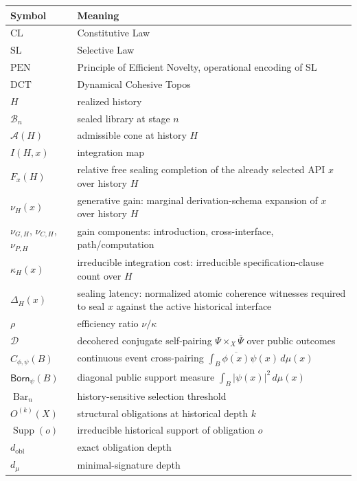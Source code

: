 \documentclass[11pt]{article}
\theoremstyle{plain}
\theoremstyle{definition}
\theoremstyle{remark}
\newcommand{\CL}{\mathrm{CL}}
\newcommand{\SLaw}{\mathrm{SL}}
\newcommand{\PEN}{\mathrm{PEN}}
\newcommand{\DCT}{\mathrm{DCT}}
\newcommand{\B}{\mathcal{B}}
\newcommand{\A}{\mathcal{A}}
\newcommand{\Supp}{\operatorname{Supp}}
\newcommand{\SelBar}{\operatorname{Bar}}
\begin{document}
\begin{longtable}{@{}>{\raggedright\arraybackslash}p{}>{\raggedright\arraybackslash}p{}@{}}
\toprule
Symbol & Meaning \\
\midrule
\endhead
\(\CL\) & Constitutive Law \\
\(\SLaw\) & Selective Law \\
\(\PEN\) & Principle of Efficient Novelty, operational encoding of \(\SLaw\) \\
\(\DCT\) & Dynamical Cohesive Topos \\
\(H\) & realized history \\
\(\B_n\) & sealed library at stage \(n\) \\
\(\A(H)\) & admissible cone at history \(H\) \\
\(I(H,x)\) & integration map \\
\(F_x(H)\) & relative free sealing completion of the already selected API \(x\) over history \(H\) \\
\(\nu_H(x)\) & generative gain: marginal derivation-schema expansion of \(x\) over history \(H\) \\
\(\nu_{G,H}\), \(\nu_{C,H}\), \(\nu_{P,H}\) & gain components: introduction, cross-interface, path/computation \\
\(\kappa_H(x)\) & irreducible integration cost: irreducible specification-clause count over \(H\) \\
\(\Delta_H(x)\) & sealing latency: normalized atomic coherence witnesses required to seal \(x\) against the active historical interface \\
\(\rho\) & efficiency ratio \(\nu/\kappa\) \\
\(\mathcal{D}\) & decohered conjugate self-pairing \(\Psi\times_X\overline{\Psi}\) over public outcomes \\
\(C_{\phi,\psi}(B)\) & continuous event cross-pairing \(\int_B\overline{\phi(x)}\psi(x)\,d\mu(x)\) \\
\(\mathsf{Born}_\psi(B)\) & diagonal public support measure \(\int_B|\psi(x)|^2\,d\mu(x)\) \\
\(\SelBar_n\) & history-sensitive selection threshold \\
\(O^{(k)}(X)\) & structural obligations at historical depth \(k\) \\
\(\Supp(o)\) & irreducible historical support of obligation \(o\) \\
\(d_{\mathrm{obl}}\) & exact obligation depth \\
\(d_\mu\) & minimal-signature depth \\

\end{longtable}
\end{document}
